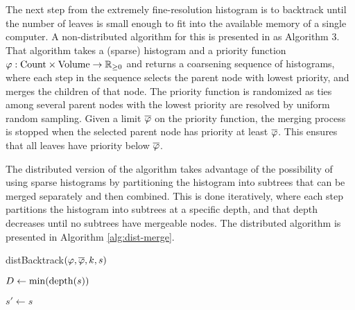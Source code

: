\documentclass[../merging.tex]{subfiles}
\begin{document}
  The next step from the extremely fine-resolution histogram is to backtrack until
  the number of leaves is small enough to fit into the available memory of a single computer.
  A non-distributed algorithm for this is presented in \cite{scala-density-tree} as Algorithm 3.
  That algorithm takes a (sparse) histogram and a priority function
  $\varphi: \text{Count} \times \text{Volume} \to \mathbb{R}_{\ge 0}$
  and returns a coarsening sequence of histograms, 
  where each step in the sequence selects the parent node with lowest priority,
  and merges the children of that node.
  The priority function is randomized as ties among several parent nodes
  with the lowest priority are resolved by uniform random sampling.
  Given a limit $\overline {\varphi}$ on the priority function,
  the merging process is stopped when the selected parent node has priority at least $\overline {\varphi}$.
  This ensures that all leaves have priority below $\overline {\varphi}$.

  The distributed version of the algorithm takes advantage of
  the possibility of using sparse histograms by
  partitioning the histogram into subtrees that can be merged separately and then combined.
  This is done iteratively, where each step partitions 
  the histogram into subtrees at a specific depth,
  and that depth decreases until no subtrees have mergeable nodes.
  The distributed algorithm is presented in Algorithm \ref{alg:dist-merge}.

  \begin{algorithm}
    \caption{distBacktrack$(\varphi, \overline {\varphi}, k, s)$}
    \label{alg:dist-merge}

    $D \gets \min( {\mathop{\rm depth}} ( s ) )$

    $s' \gets s$


  \end{algorithm}
\end{document}

